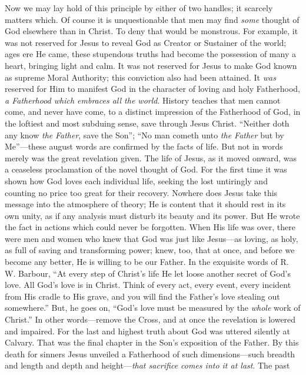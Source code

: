 \documentclass[12pt,a5paper,oneside]{book}
\begin{document}
Now we may lay hold of this principle by
either of two handles; it scarcely matters
which. Of course it is unquestionable that
men may find \textit{some} thought of God elsewhere
than in Christ. To deny that would be monstrous. 
For example, it was not reserved for
Jesus to reveal God as Creator or Sustainer
of the world; ages ere He came, these stupendous 
truths had become the possession of many
a heart, bringing light and calm. It was not
reserved for Jesus to make God known as
supreme Moral Authority; this conviction also
had been attained. It \textit{was} reserved for Him
to manifest God in the character of loving and
holy Fatherhood, \textit{a Fatherhood which embraces
all the world}. History teaches that men cannot
come, and never have come, to a distinct
impression of the Fatherhood of God, in the
loftiest and most subduing sense, save through
Jesus Christ. ``Neither doth any know \textit{the}
\textit{Father}, save the Son''; ``No man cometh
unto \textit{the Father} but by Me''---these august
words are confirmed by the facts of life. But
not in words merely was the great revelation
given. The life of Jesus, as it moved onward,
was a ceaseless proclamation of the novel
thought of God. For the first time it was
shown how God loves each individual life,
seeking the lost untiringly and counting no
price too great for their recovery. Nowhere
does Jesus take this message into the atmosphere 
of theory; He is content that it should
rest in its own unity, as if any analysis must
disturb its beauty and its power. But He
wrote the fact in actions which could never
be forgotten. When His life was over, there
were men and women who knew that God
was just like Jesus---as loving, as holy, as full
of saving and transforming power; knew, too,
that at once, and before we become any
better, He is willing to be our Father. In
the exquisite words of R. W. Barbour, ``At
every step of Christ's life He let loose another
secret of God's love. All God's love is in
Christ. Think of every act, every event, every
incident from His cradle to His grave, and
you will find the Father's love stealing out
somewhere.'' But, he goes on, ``God's love
must be measured by the \textit{whole} work of Christ.''
In other words---remove the Cross, and at once
the revelation is lowered and impaired. For
the last and highest truth about God was
uttered silently at Calvary. That was the
final chapter in the Son's exposition of the
Father. By this death for sinners Jesus unveiled 
a Fatherhood of such dimensions---such
breadth and length and depth and 
height---\textit{that sacrifice comes into it at last}. The past
\end{document}

